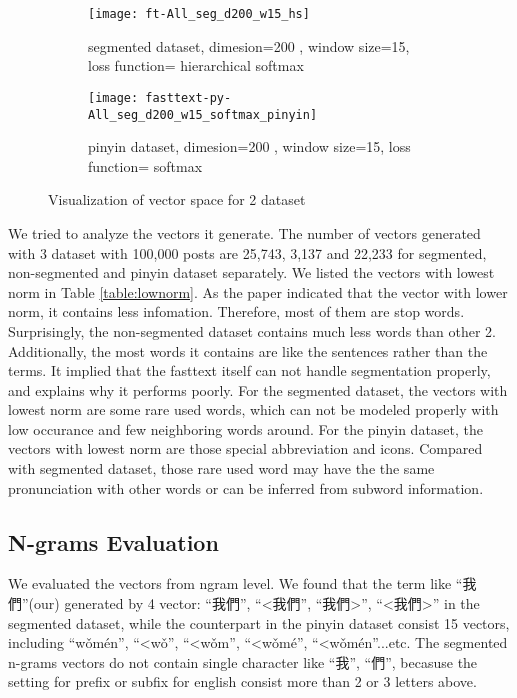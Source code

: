 \begin{figure}[H]
    \centering     
    \begin{subfigure}[b]{0.6\textwidth}
        \centering
        \texttt{[image: ft-All\_seg\_d200\_w15\_hs]}
        \caption{segmented dataset, dimesion=200 , window size=15, loss function=  hierarchical softmax}
    \end{subfigure}
    \begin{subfigure}[b]{0.6\textwidth}
        \centering
        \texttt{[image: fasttext-py-All\_seg\_d200\_w15\_softmax\_pinyin]}
        \caption{pinyin dataset,  dimesion=200 , window size=15, loss function= softmax}
    \end{subfigure}
    \caption{Visualization of vector space for 2 dataset}
    \label{tsne}
\end{figure}

We tried to analyze the vectors it generate. The number of vectors generated with 3 dataset with 100,000 posts are 25,743, 3,137 and 22,233 for segmented, non-segmented and pinyin dataset separately. 
We listed the vectors with lowest norm in Table \ref{table:lownorm}. As the paper indicated that the vector with lower norm, it contains less infomation. 
Therefore, most of them are stop words. Surprisingly, the non-segmented dataset contains much less words than other 2. 
Additionally, the most words it contains are like the sentences rather than the terms. It implied that the fasttext itself can not handle segmentation properly, and explains why it performs poorly. 
For the segmented dataset, the vectors with lowest norm are some rare used words, which can not be modeled properly with low occurance and few neighboring words around.
For the pinyin dataset, the vectors with lowest norm are those special abbreviation and icons. Compared with segmented dataset, those rare used word may have the the same pronunciation with other words or can be inferred from subword information.


\subsection{N-grams Evaluation}

We evaluated the vectors from ngram level. We found that the term like \enquote{我們}(our) generated by 4 vector: \enquote{我們}, \enquote{\textless 我們}, \enquote{我們\textgreater}, \enquote{\textless 我們\textgreater} in the segmented dataset,
while the counterpart in the pinyin dataset consist 15 vectors, including \enquote{wǒmén}, \enquote{\textless wǒ}, \enquote{\textless wǒm}, \enquote{\textless wǒmé}, \enquote{\textless wǒmén}...etc. 
The segmented n-grams vectors do not contain single character like \enquote{我}, \enquote{們}, becasuse the setting for prefix or subfix for english consist more than 2 or 3 letters above.

